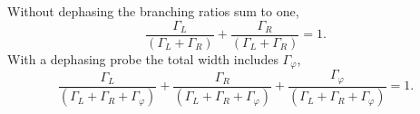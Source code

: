 \documentclass{article}
\newcommand{\Gt}{(\Gamma_L+\Gamma_R)}
\begin{document}
Without dephasing the branching ratios sum to one,
\begin{equation}
\frac{\Gamma_L}{\Gt} + \frac{\Gamma_R}{\Gt} = 1 .
\label{eq:b1}
\end{equation}
\renewcommand{\Gt}{(\Gamma_L+\Gamma_R+\Gamma_\varphi)}
With a dephasing probe the total width includes $\Gamma_\varphi$,
\begin{equation}
\frac{\Gamma_L}{\Gt} + \frac{\Gamma_R}{\Gt} + \frac{\Gamma_\varphi}{\Gt} = 1 .
\label{eq:b2}
\end{equation}
\end{document}
